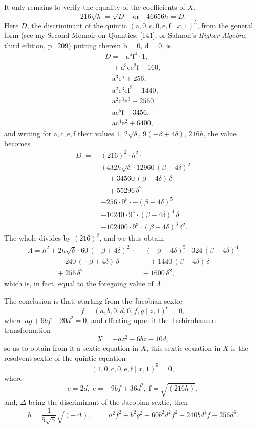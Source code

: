 \documentclass[11pt]{article}
\begin{document}
\medskip
It only remains to verify the equality of the coefficients of $X$,
\[
  216\sqrt{h}=\sqrt{D}\quad\text{or}\quad 46656h=D.
\]
Here $D$, the discriminant of the quintic
$(\mathrm{a},0,\mathrm{c},0,\mathrm{e},\mathrm{f}\mid x,1)^{5}$,
from the general form (see my Second Memoir on Quantics, [141], or
Salmon's \textit{Higher Algebra}, third edition, p.\ 209) putting
therein $\mathrm{b}=0$, $\mathrm{d}=0$, is
\[
\begin{array}{l}
D=+\mathrm{a}^{4}\mathrm{f}^{4}\cdot 1,\\
\quad+\mathrm{a}^{3}\mathrm{ce}^{2}\mathrm{f}+160,\\
\quad\mathrm{a}^{3}\mathrm{e}^{5}+256,\\
\quad\mathrm{a}^{2}\mathrm{c}^{3}\mathrm{ef}^{2}-1440,\\
\quad\mathrm{a}^{2}\mathrm{c}^{3}\mathrm{e}^{3}-2560,\\
\quad\mathrm{ac}^{5}\mathrm{f}+3456,\\
\quad\mathrm{ac}^{4}\mathrm{e}^{2}+6400,
\end{array}
\]
and writing for $\mathrm{a},\mathrm{c},\mathrm{e},\mathrm{f}$ their
values $1$, $2\sqrt{\delta}$, $9(-\beta+4\delta)$, $216h$, the
value becomes
\begin{align*}
D\;=\;& (216)^{2}\cdot h^{2}\cdot\\
& +432h\sqrt{\delta}\cdot 12960\,(\beta-4\delta)^{2}\\
& \quad+34560\,(\beta-4\delta)\,\delta\\
& \quad+55296\,\delta^{2}\\
& -256\cdot 9^{5}\cdot-(\beta-4\delta)^{5}\\
& -10240\cdot 9^{4}\cdot(\beta-4\delta)^{4}\,\delta\\
& -102400\cdot 9^{3}\cdot(\beta-4\delta)^{3}\,\delta^{2}.
\end{align*}
The whole divides by $(216)^{2}$, and we thus obtain
\[
\begin{array}{l}
\Lambda=h^{2}+2h\sqrt{\delta}\cdot 60\,(-\beta+4\delta)^{2}\,\cdot\,+(-\beta-4\delta)^{5}\cdot\,324\,(\beta-4\delta)^{4}\\
\qquad\qquad-240\,(-\beta+4\delta)\,\delta\,\quad\quad\quad\quad+1440\,(\beta-4\delta)\,\delta\\
\qquad\qquad+256\,\delta^{2}\,\quad\quad\quad\quad\quad\quad\quad\quad+1600\,\delta^{2},
\end{array}
\]
which is, in fact, equal to the foregoing value of $\Lambda$.

\newpage
\noindent
The conclusion is that, starting from the Jacobian sextic
\[
  f=(a,b,0,d,0,f,g\mid z,1)^{6}=0,
\]
where $ag+9bf-20d^{2}=0$, and effecting upon it the
Tschirnhausen-transformation
\[
  X=-az^{2}-6bz-10d,
\]
so as to obtain from it a sextic equation in $X$, this sextic
equation in $X$ is the resolvent sextic of the quintic equation
\[
  (1,0,\mathrm{c},0,\mathrm{e},\mathrm{f}\mid x,1)^{5}=0,
\]
where
\[
  \mathrm{c}=2d,\;\mathrm{e}=-9bf+36d^{2},\;\mathrm{f}=\sqrt{(216h)},
\]
and, $\Delta$ being the discriminant of the Jacobian sextic, then
\[
  h=\frac{1}{5\sqrt{5}}\sqrt{(-\Delta)},\quad
  =a^{2}f^{2}+b^{2}g^{2}+60b^{2}d^{2}f^{2}-240bd^{4}f+256d^{6}.
\]
\end{document}
